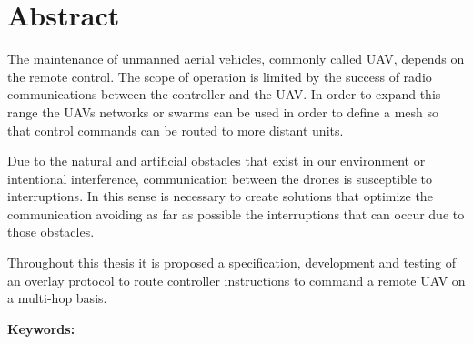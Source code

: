 \chapter*{Abstract}

The maintenance of unmanned aerial vehicles, commonly called UAV, depends on the remote control. The scope of operation is limited by the success of radio communications between the controller and the UAV. In order to expand this range the UAVs networks or swarms can be used in order to define a mesh so that control commands can be routed to more distant units.

Due to the natural and artificial obstacles that exist in our environment or intentional interference, communication between the drones is susceptible to interruptions. In this sense is necessary to create solutions that optimize the communication avoiding as far as possible the interruptions that can occur due to those obstacles.

Throughout this thesis it is proposed a specification, development and testing of an overlay protocol to route controller instructions to command a remote UAV on a multi-hop basis.\newline 

\noindent\textbf{Keywords: }%
\makeatletter
\@keywords
\makeatother
